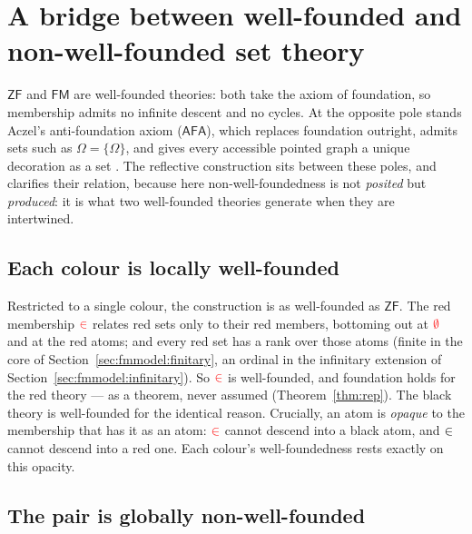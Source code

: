 
\section{A bridge between well-founded and non-well-founded set theory}
\label{sec:nwf}

$\mathsf{ZF}$ and $\mathsf{FM}$ are well-founded theories: both take the axiom of
foundation, so membership admits no infinite descent and no cycles. At the
opposite pole stands Aczel's anti-foundation axiom ($\mathsf{AFA}$), which
replaces foundation outright, admits sets such as $\Omega=\{\Omega\}$, and gives
every accessible pointed graph a unique decoration as a set
\cite{aczel1988nwf,barwise1996vicious}. The reflective construction sits between
these poles, and
clarifies their relation, because here non-well-foundedness is not \emph{posited}
but \emph{produced}: it is what two well-founded theories generate when they are
intertwined.

\subsection{Each colour is locally well-founded}
\label{sec:nwf:local}

Restricted to a single colour, the construction is as well-founded as
$\mathsf{ZF}$. The red membership $\mathrel{\textcolor{red}{\in}}$ relates red sets only to their red
members, bottoming out at $\textcolor{red}{\emptyset}$ and at the red atoms; and every red set has a
rank over those atoms (finite in the core of
Section~\ref{sec:fmmodel:finitary}, an ordinal in the infinitary extension of
Section~\ref{sec:fmmodel:infinitary}). So $\mathrel{\textcolor{red}{\in}}$ is well-founded, and foundation
holds for the red theory --- as a theorem, never assumed
(Theorem~\ref{thm:rep}). The black theory is well-founded for the identical
reason. Crucially, an atom is \emph{opaque} to the membership that has it as an
atom: $\mathrel{\textcolor{red}{\in}}$ cannot descend into a black atom, and $\mathrel{\textcolor{black}{\in}}$ cannot descend into a
red one. Each colour's well-foundedness rests exactly on this opacity.

\subsection{The pair is globally non-well-founded}
\label{sec:nwf:global}

